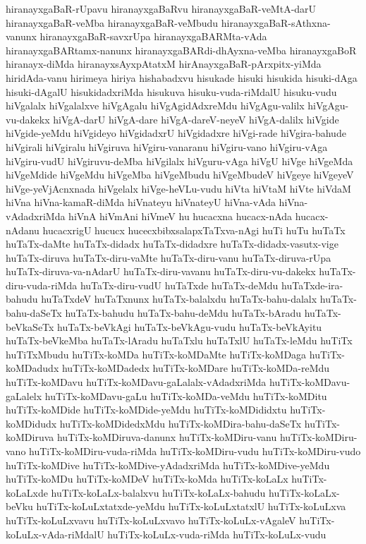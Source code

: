 {hiranayxgaBaR-rUpavu
hiranayxgaBaRvu
hiranayxgaBaR-veMtA-darU
hiranayxgaBaR-veMba
hiranayxgaBaR-veMbudu
hiranayxgaBaR-sAthxna-vanunx
hiranayxgaBaR-savxrUpa
hiranayxgaBARMta-vAda
hiranayxgaBARtamx-nanunx
hiranayxgaBARdi-dhAyxna-veMba
hiranayxgaBoR
hiranayx-diMda
hiranayxsAyxpAtatxM
hirAnayxgaBaR-pArxpitx-yiMda
hiridAda-vanu
hirimeya
hiriya
hishabadxvu
hisukade
hisuki
hisukida
hisuki-dAga
hisuki-dAgalU
hisukidadxriMda
hisukuva
hisuku-vuda-riMdalU
hisuku-vudu
hiVgalalx
hiVgalalxve
hiVgAgalu
hiVgAgidAdxreMdu
hiVgAgu-valilx
hiVgAgu-vu-dakekx
hiVgA-darU
hiVgA-dare
hiVgA-dareV-neyeV
hiVgA-dalilx
hiVgide
hiVgide-yeMdu
hiVgideyo
hiVgidadxrU
hiVgidadxre
hiVgi-rade
hiVgira-bahude
hiVgirali
hiVgiralu
hiVgiruva
hiVgiru-vanaranu
hiVgiru-vano
hiVgiru-vAga
hiVgiru-vudU
hiVgiruvu-deMba
hiVgilalx
hiVguru-vAga
hiVgU
hiVge
hiVgeMda
hiVgeMdide
hiVgeMdu
hiVgeMba
hiVgeMbudu
hiVgeMbudeV
hiVgeye
hiVgeyeV
hiVge-yeVjAcnxnada
hiVgelalx
hiVge-heVLu-vudu
hiVta
hiVtaM
hiVte
hiVdaM
hiVna
hiVna-kamaR-diMda
hiVnateyu
hiVnateyU
hiVna-vAda
hiVna-vAdadxriMda
hiVnA
hiVmAni
hiVmeV
hu
hucacxna
hucacx-nAda
hucacx-nAdanu
hucacxrigU
hucucx
hucecxbibxsalapxTaTxva-nAgi
huTi
huTu
huTaTx
huTaTx-daMte
huTaTx-didadx
huTaTx-didadxre
huTaTx-didadx-vasutx-vige
huTaTx-diruva
huTaTx-diru-vaMte
huTaTx-diru-vanu
huTaTx-diruva-rUpa
huTaTx-diruva-va-nAdarU
huTaTx-diru-vavanu
huTaTx-diru-vu-dakekx
huTaTx-diru-vuda-riMda
huTaTx-diru-vudU
huTaTxde
huTaTx-deMdu
huTaTxde-ira-bahudu
huTaTxdeV
huTaTxnunx
huTaTx-balalxdu
huTaTx-bahu-dalalx
huTaTx-bahu-daSeTx
huTaTx-bahudu
huTaTx-bahu-deMdu
huTaTx-bAradu
huTaTx-beVkaSeTx
huTaTx-beVkAgi
huTaTx-beVkAgu-vudu
huTaTx-beVkAyitu
huTaTx-beVkeMba
huTaTx-lAradu
huTaTxlu
huTaTxlU
huTaTx-leMdu
huTiTx
huTiTxMbudu
huTiTx-koMDa
huTiTx-koMDaMte
huTiTx-koMDaga
huTiTx-koMDadudx
huTiTx-koMDadedx
huTiTx-koMDare
huTiTx-koMDa-reMdu
huTiTx-koMDavu
huTiTx-koMDavu-gaLalalx-vAdadxriMda
huTiTx-koMDavu-gaLalelx
huTiTx-koMDavu-gaLu
huTiTx-koMDa-veMdu
huTiTx-koMDitu
huTiTx-koMDide
huTiTx-koMDide-yeMdu
huTiTx-koMDididxtu
huTiTx-koMDidudx
huTiTx-koMDidedxMdu
huTiTx-koMDira-bahu-daSeTx
huTiTx-koMDiruva
huTiTx-koMDiruva-danunx
huTiTx-koMDiru-vanu
huTiTx-koMDiru-vano
huTiTx-koMDiru-vuda-riMda
huTiTx-koMDiru-vudu
huTiTx-koMDiru-vudo
huTiTx-koMDive
huTiTx-koMDive-yAdadxriMda
huTiTx-koMDive-yeMdu
huTiTx-koMDu
huTiTx-koMDeV
huTiTx-koMda
huTiTx-koLaLx
huTiTx-koLaLxde
huTiTx-koLaLx-balalxvu
huTiTx-koLaLx-bahudu
huTiTx-koLaLx-beVku
huTiTx-koLuLxtatxde-yeMdu
huTiTx-koLuLxtatxlU
huTiTx-koLuLxva
huTiTx-koLuLxvavu
huTiTx-koLuLxvavo
huTiTx-koLuLx-vAgaleV
huTiTx-koLuLx-vAda-riMdalU
huTiTx-koLuLx-vuda-riMda
huTiTx-koLuLx-vudu
}
